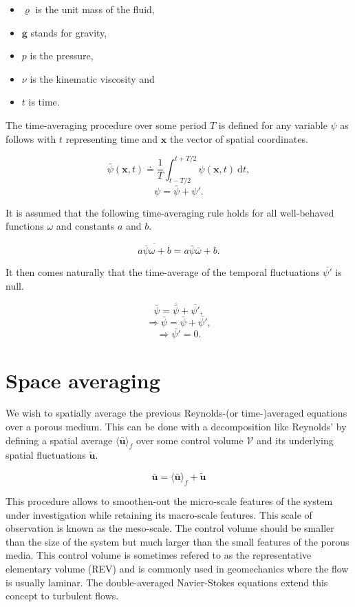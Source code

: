 \documentclass[a4paper,11pt]{article}
\begin{document}
\begin{itemize}
  \item $\varrho$ is the unit mass of the fluid,
  \item $\bm g$ stands for gravity,
  \item $p$ is the pressure,
  \item $\nu$ is the kinematic viscosity and
  \item $t$ is time.
\end{itemize}

The time-averaging procedure over some period $T$ is defined for any variable $\psi$ as follows with $t$ representing time and $\bm x$ the vector of spatial coordinates.

$$\bar \psi(\bm x, t)\doteq\frac{1}{T}\int_{t-T/2}^{t+T/2} \psi(\bm x, t)~\mathrm dt,$$
$$\psi = \bar \psi + \psi'.$$

It is assumed that the following time-averaging rule holds for all well-behaved functions $\omega$ and constants $a$ and $b$.

$$\overline{a\bar\psi\omega+b} = a\bar\psi\bar\omega+b.$$

It then comes naturally that the time-average of the temporal fluctuations $\overline{\psi'}$ is null.

$$\bar\psi=\overline{\bar\psi}+\overline{\psi'},$$
$$\Rightarrow \bar\psi=\bar\psi+\overline{\psi'},$$
$$\Rightarrow \overline{\psi'}=0.$$

\section{Space averaging}

We wish to spatially average the previous Reynolds-(or time-)averaged equations over a porous medium. This can be done with a decomposition like Reynolds' by defining a spatial average $\langle\bm{\bar u}\rangle_f$ over some control volume $\mathcal V$ and its underlying spatial fluctuations $\tilde{\bm u}$.

\begin{equation}\label{eq:decomposition}
  {\bm{\bar u} = \langle\bm{\bar u}\rangle_f + \tilde{\bm u}}
\end{equation}

This procedure allows to smoothen-out the micro-scale features of the system under investigation while retaining its macro-scale features. This scale of observation is known as the meso-scale.
The control volume should be smaller than the size of the system but much larger than the small features of the porous media.
This control volume is sometimes refered to as the representative elementary volume (REV) and is commonly used in geomechanics where the flow is usually laminar. The double-averaged Navier-Stokes equations extend this concept to turbulent flows.
\end{document}
